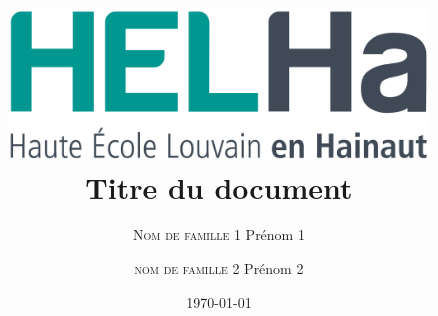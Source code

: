 \documentclass[12pt,a4paper]{report} %
\begin{document}

\author{\textsc{Nom de famille 1} Prénom 1\and\textsc{nom de famille 2} Prénom 2} %
\date{\today} %
\title{\centering\includegraphics[height=4cm]{HELHa}\\Titre du document} %
\setlength\droptitle{-6cm}
\pretitle{\begin{center}\Huge\bfseries}
\posttitle{\end{center}\vskip2cm}
\end{document}
